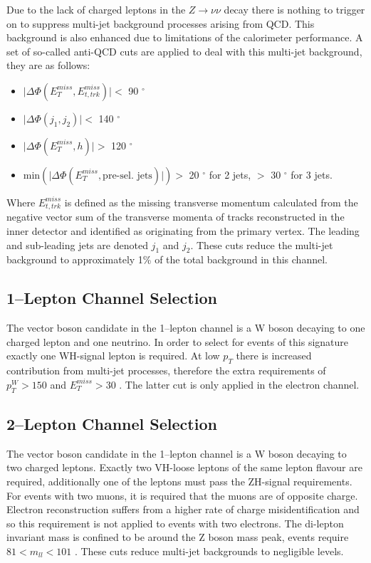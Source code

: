 Due to the lack of charged leptons in the $Z \rightarrow \nu\nu$ decay there is
nothing to trigger on to suppress multi-jet background processes arising from
QCD. This background is also enhanced due to limitations of the calorimeter
performance. A set of so-called anti-QCD cuts are applied to deal with this
multi-jet background, they are as follows:
\begin{itemize}
\item $\lvert \Delta \Phi ( E_T^{miss} , E_{t, trk}^{miss} ) \rvert <$ 90 $^\circ$
\item $\lvert \Delta \Phi ( j_1 , j_2 ) \rvert <$ 140 $^\circ$
\item $\lvert \Delta \Phi ( E_T^{miss} , h ) \rvert >$ 120 $^\circ$
\item $\text{min} ( \lvert \Delta \Phi ( E_T^{miss} , \text{pre-sel. jets}) \rvert ) >$ 20 $^\circ$ for  2 jets, $>$ 30 $^\circ$ for 3 jets.
\end{itemize}
Where $E_{t, trk}^{miss}$ is defined as the missing transverse momentum
calculated from the negative vector sum of the transverse momenta of tracks
reconstructed in the inner detector and identified as originating from the
primary vertex. The leading and sub-leading jets are denoted $j_1$ and $j_2$.
These cuts reduce the multi-jet background to approximately 1\% of the total
background in this channel.


\subsection{1--Lepton Channel Selection}
\label{sec:1lep-selection}

The vector boson candidate in the 1--lepton channel is a W boson decaying to one
charged lepton and one neutrino. In order to select for events of this signature
exactly one WH-signal lepton is required. At low $p_T$ there is increased
contribution from multi-jet processes, therefore the extra requirements of
$p_T^{W} > 150$ \GeV and $E_T^{miss} > 30$ \GeV. The latter cut is only applied in
the electron channel.  

\subsection{2--Lepton Channel Selection}
\label{sec:2lep-selection}

The vector boson candidate in the 1--lepton channel is a W boson decaying to two
charged leptons. Exactly two VH-loose leptons of the same lepton flavour are
required, additionally one of the leptons must pass the ZH-signal requirements.
For events with two muons, it is required that the muons are of opposite charge.
Electron reconstruction suffers from a higher rate of charge misidentification
and so this requirement is not applied to events with two electrons. The
di-lepton invariant mass is confined to be around the Z boson mass peak, events
require $81 < m_{ll} < 101$ \GeV. These cuts reduce multi-jet backgrounds to
negligible levels. 

